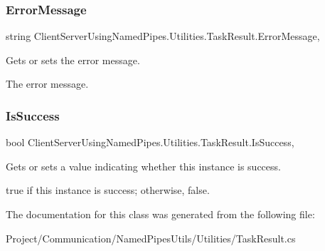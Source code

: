 \subsubsection{\texorpdfstring{Error\+Message}{ErrorMessage}}
{\footnotesize\ttfamily string Client\+Server\+Using\+Named\+Pipes.\+Utilities.\+Task\+Result.\+Error\+Message\hspace{0.3cm}{\ttfamily [get]}, {\ttfamily [set]}}



Gets or sets the error message. 

The error message.\mbox{\label{class_client_server_using_named_pipes_1_1_utilities_1_1_task_result_a3c996932ff1f7e1754af3f0b34f6669e}} 
\subsubsection{\texorpdfstring{Is\+Success}{IsSuccess}}
{\footnotesize\ttfamily bool Client\+Server\+Using\+Named\+Pipes.\+Utilities.\+Task\+Result.\+Is\+Success\hspace{0.3cm}{\ttfamily [get]}, {\ttfamily [set]}}



Gets or sets a value indicating whether this instance is success. 

{\ttfamily true} if this instance is success; otherwise, {\ttfamily false}.

The documentation for this class was generated from the following file\+:\begin{DoxyCompactItemize}
\item 
Project/\+Communication/\+Named\+Pipes\+Utils/\+Utilities/Task\+Result.\+cs\end{DoxyCompactItemize}
